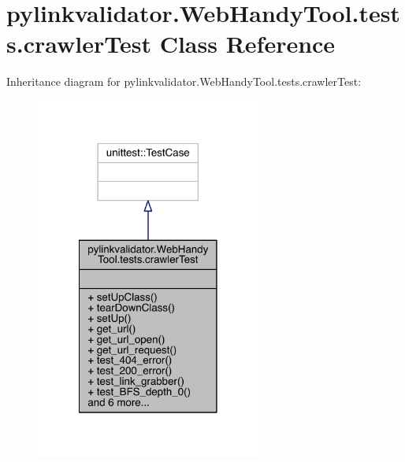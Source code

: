 \hypertarget{classpylinkvalidator_1_1_web_handy_tool_1_1tests_1_1crawler_test}{}\section{pylinkvalidator.\+Web\+Handy\+Tool.\+tests.\+crawler\+Test Class Reference}
\label{classpylinkvalidator_1_1_web_handy_tool_1_1tests_1_1crawler_test}


Inheritance diagram for pylinkvalidator.\+Web\+Handy\+Tool.\+tests.\+crawler\+Test\+:
\nopagebreak
\begin{figure}[H]
\begin{center}
\leavevmode
\includegraphics[width=210pt]{classpylinkvalidator_1_1_web_handy_tool_1_1tests_1_1crawler_test__inherit__graph}
\end{center}
\end{figure}


